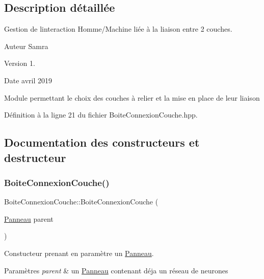 \subsection{Description détaillée}
Gestion de l\textquotesingle{}interaction Homme/\+Machine liée à la liaison entre 2 couches. 

\begin{DoxyAuthor}{Auteur}
Samra 
\end{DoxyAuthor}
\begin{DoxyVersion}{Version}
1. 
\end{DoxyVersion}
\begin{DoxyDate}{Date}
avril 2019
\end{DoxyDate}
Module permettant le choix des couches à relier et la mise en place de leur liaison 

Définition à la ligne 21 du fichier Boite\+Connexion\+Couche.\+hpp.



\subsection{Documentation des constructeurs et destructeur}
\mbox{\label{class_boite_connexion_couche_a69b773ea326589e81c3beba4f8eef4e7}} 
\subsubsection{\texorpdfstring{Boite\+Connexion\+Couche()}{BoiteConnexionCouche()}}
{\footnotesize\ttfamily Boite\+Connexion\+Couche\+::\+Boite\+Connexion\+Couche (\begin{DoxyParamCaption}\item[{\hyperlink{class_panneau}{Panneau}}]{parent }\end{DoxyParamCaption})}



Constucteur prenant en paramètre un \hyperlink{class_panneau}{Panneau}. 


\begin{DoxyParams}{Paramètres}
{\em parent} & un \hyperlink{class_panneau}{Panneau} contenant déja un réseau de neurones \\
\hline
\end{DoxyParams}


